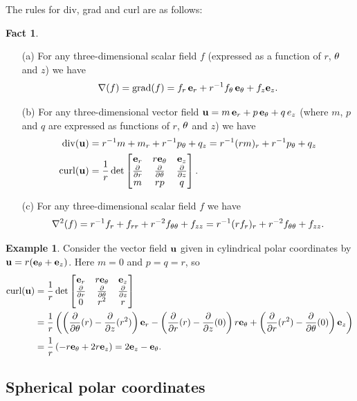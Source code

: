 \documentclass[reqno]{amsart}
\theoremstyle{definition}
\newtheorem{example}[theorem]{Example}
\newtheorem{fact}[theorem]{Fact}
\begin{document}
The rules for div, grad and curl are as follows:
\begin{fact}\label{fact-polar-fields-cyl}
 \begin{itemize}
  \item[(a)] For any three-dimensional scalar field $f$ (expressed as a
   function of $r$, $\theta$ and $z$) we have 
   \[ \nabla(f) = \operatorname{grad}(f) = f_r\,\mathbf{e}_r + r^{-1}f_\theta\,\mathbf{e}_\theta + f_z\mathbf{e}_z. \]
  \item[(b)] For any three-dimensional vector field
   $\mathbf{u}=m\,\mathbf{e}_r+p\,\mathbf{e}_\theta+q\,e_z$ (where $m$, $p$ and $q$ are expressed as
   functions of $r$, $\theta$ and $z$) we have 
   \begin{align*}
    \operatorname{div}(\mathbf{u})
     &= r^{-1}m + m_r + r^{-1}p_\theta + q_z 
      = r^{-1}(rm)_r + r^{-1}p_\theta + q_z \\
    \operatorname{curl}(\mathbf{u})
     &= \frac{1}{r} \det\left[\begin{matrix}
          \mathbf{e}_r & r\mathbf{e}_\theta & \mathbf{e}_z \\
          \frac{\partial}{\partial r}  & \frac{\partial}{\partial\theta}      & \frac{\partial}{\partial z}  \\
          m     & rp        & q \end{matrix}\right].
   \end{align*}
  \item[(c)] For any three-dimensional scalar field $f$ we have 
   \[ \nabla^2(f) = r^{-1}f_r + f_{rr} + r^{-2}f_{\theta\theta} + f_{zz}
        = r^{-1}(rf_r)_r + r^{-2}f_{\theta\theta} + f_{zz}.
   \]
 \end{itemize}
\end{fact}
\begin{example}
 Consider the vector field $\mathbf{u}$ given in cylindrical polar
 coordinates by $\mathbf{u}=r(\mathbf{e}_\theta+\mathbf{e}_z)$.  Here $m=0$ and $p=q=r$, so 
 \begin{align*}
   \operatorname{curl}(\mathbf{u})
     &= \frac{1}{r} \det\left[\begin{matrix}
         \mathbf{e}_r & r\mathbf{e}_\theta & \mathbf{e}_z \\
         \frac{\partial}{\partial r}  & \frac{\partial}{\partial\theta}      & \frac{\partial}{\partial z}  \\
         0     & r^2        & r \end{matrix}\right] \\
    &= \frac{1}{r}\left(
        \left(\frac{\partial}{\partial\theta}(r)-\frac{\partial}{\partial z}(r^2)\right)\mathbf{e}_r -
        \left(\frac{\partial}{\partial r}(r)-\frac{\partial}{\partial z}(0)\right)r\mathbf{e}_\theta +
        \left(\frac{\partial}{\partial r}(r^2)-\frac{\partial}{\partial\theta}(0)\right)\mathbf{e}_z
       \right) \\
    &= \frac{1}{r}\left(-r\mathbf{e}_\theta+2r\mathbf{e}_z\right) 
     = 2\mathbf{e}_z - \mathbf{e}_\theta.
 \end{align*}

\end{example}

\subsection{Spherical polar coordinates}
\label{subsec-polar-fields-sph}
\end{document}
